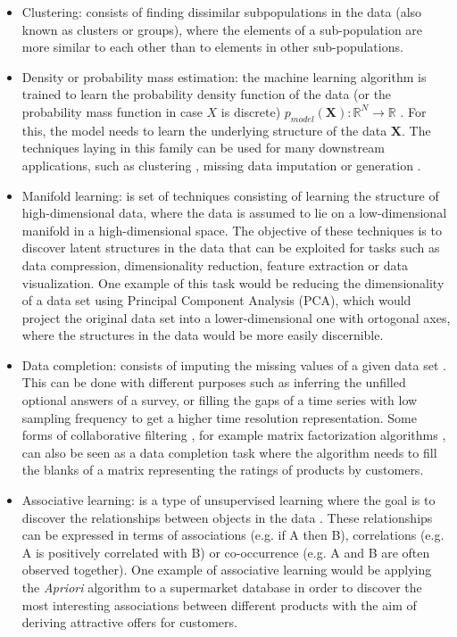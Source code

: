 \begin{itemize}
	\item Clustering: consists of finding dissimilar subpopulations in the data (also known as clusters or groups), where the elements of a sub-population are more similar to each other than to elements in other sub-populations.
	\item Density or probability mass estimation: the machine learning algorithm is trained to learn the probability density function of the data (or the probability mass function in case $X$ is discrete) $p_{model}(\textbf{X}): \mathbb{R}^N \rightarrow \mathbb{R}$ \cite{Goodfellow2016}. For this, the model needs to learn the underlying structure of the data $\mathbf{X}$. The techniques laying in this family can be used for many downstream applications, such as clustering \cite{wang2006}, missing data imputation \cite{qichuan2015} or generation \cite{liu2020}. 
	\item Manifold learning: is set of techniques consisting of learning the structure of high-dimensional data, where the data is assumed to lie on a low-dimensional manifold in a high-dimensional space. The objective of these techniques is to discover latent structures in the data that can be exploited for tasks such as data compression, dimensionality reduction, feature extraction or data visualization. One example of this task would be reducing the dimensionality of a data set using Principal Component Analysis (PCA), which would project the original data set into a lower-dimensional one with ortogonal axes, where the structures in the data would be more easily discernible.
	\item Data completion: consists of imputing the missing values of a given data set \cite{vanburen_2018}. This can be done with different purposes such as inferring the unfilled optional answers of a survey, or filling the gaps of a time series with low sampling frequency to get a higher time resolution representation. Some forms of collaborative filtering \cite{falk2019}, for example matrix factorization algorithms \cite{koren2009}, can also be seen as a data completion task where the algorithm needs to fill the blanks of a matrix representing the ratings of products by customers.
	\item Associative learning:  is a type of unsupervised learning where the goal is to discover the relationships between objects in the data \cite{zhang2002}. These relationships can be expressed in terms of associations (e.g. if A then B), correlations (e.g. A is positively correlated with B) or co-occurrence (e.g. A and B are often observed together). One example of associative learning would be applying the \textit{Apriori} algorithm \cite{agrawal1996} to a supermarket database in order to discover the most interesting associations between different products with the aim of deriving attractive offers for customers. 

\end{itemize}

